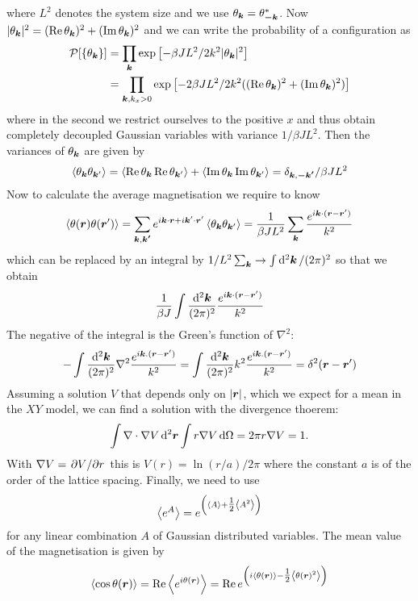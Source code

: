  where $L^2$ denotes the system size and we use $\theta_{\boldsymbol{k}} = \theta_{\boldsymbol{-k}}^*$. Now $|\theta_{\boldsymbol{k}}|^2 = (\Re \theta_{\boldsymbol{k}})^2 + (\Im \theta_{\boldsymbol{k}})^2$ and we can write the probability of a configuration as 
 \[
 \begin{split}
 \mathcal{P}[\{\theta_{\boldsymbol{k}}\}] &= \prod_{\boldsymbol{k}} \exp \left[-\beta J L^2/2 k^2 |\theta_{\boldsymbol{k}}|^2 \right] \\ &=\prod_{\boldsymbol{k}, k_x > 0} \exp \left[-2\beta J L^2/2 k^2((\Re \theta_{\boldsymbol{k}})^2 + (\Im \theta_{\boldsymbol{k}})^2) \right]
 \end{split}
 \]
 where in the second we restrict ourselves to the positive $x$ and thus obtain completely decoupled Gaussian variables with variance $1/\beta J L^2$. Then the variances of $\theta_{\boldsymbol{k}}$ are given by 
 \[
 \left < \theta_{\boldsymbol{k}} \theta_{\boldsymbol{k}'} \right > = \left < \Re \theta_{\boldsymbol{k}} \Re \theta_{\boldsymbol{k}'} \right > + \left < \Im \theta_{\boldsymbol{k}} \Im \theta_{\boldsymbol{k}'} \right > = \delta_{\boldsymbol{k}, \boldsymbol{-k'}}/\beta J L^2 
 \]
 Now to calculate the average magnetisation we require to know 
 \[
 \left < \theta(\boldsymbol{r})\theta(\boldsymbol{r}') \right > = \sum_{\boldsymbol{k}, \boldsymbol{k'}} e^{i \boldsymbol{k} \cdot \boldsymbol{r} + i \boldsymbol{k}' \cdot \boldsymbol{r}'} \left < \theta_{\boldsymbol{k}} \theta_{\boldsymbol{k}'} \right > = \frac{1}{\beta JL^2}\sum_{\boldsymbol{k}} \frac{e^{i \boldsymbol{k} \cdot( \boldsymbol{r} - \boldsymbol{r}')}}{k^2}
 \]
 which can be replaced by an integral by $1/L^2 \sum_{\boldsymbol{k}} \to \int \dd[2]{\boldsymbol{k}}/(2\pi)^2 $ so that we obtain
 \[
 \frac{1}{\beta J} \int \frac{\dd[2]{\boldsymbol{k}}}{(2 \pi)^2} \frac{e^{i \boldsymbol{k} \cdot( \boldsymbol{r} - \boldsymbol{r}')}}{k^2}
 \]
 The negative of the integral is the Green's function of $\nabla^2$:
 \[
 -\int  \frac{\dd[2]{\boldsymbol{k}}}{(2 \pi)^2} \nabla^2 \frac{e^{i \boldsymbol{k}.(\boldsymbol{r} - \boldsymbol{r}')}}{k^2} = \int  \frac{\dd[2]{\boldsymbol{k}}}{(2 \pi)^2} k^2 \frac{e^{i \boldsymbol{k}.(\boldsymbol{r} - \boldsymbol{r}')}}{k^2} = \delta^2(\boldsymbol{r}-\boldsymbol{r}')
 \]
 Assuming a solution $V$ that depends only on $|\boldsymbol{r}|$, which we expect for a mean in the $XY$ model, we can find a solution with the divergence thoerem:
 \[
 \int \nabla \cdot \nabla V\dd[2]{\boldsymbol{r}} \int r \nabla V \dd{\Omega} = 2 \pi r \nabla V  = 1. 
 \]
 With $\nabla V = \pdv*{V}{r}$  this is $V(r) = \ln(r/a)/2\pi$ where the constant $a$ is of the order of the lattice spacing. Finally, we need to use 
 \[
 \left < e^{A} \right > = e^{\left(\left < A \right > + \tfrac12 \left < A^2 \right >\right)}
 \]
 for any linear combination $A$ of Gaussian distributed variables. The mean value of the magnetisation is given by
 \[
 \left < \cos \theta( \boldsymbol{r}) \right>  = \Re \left < e^{i\theta(\boldsymbol{r})} \right > = \Re e^{\left(i\left < \theta(\boldsymbol{r}) \right > - \tfrac12 \left < \theta(\boldsymbol{r})^2 \right >\right)}
 \]
